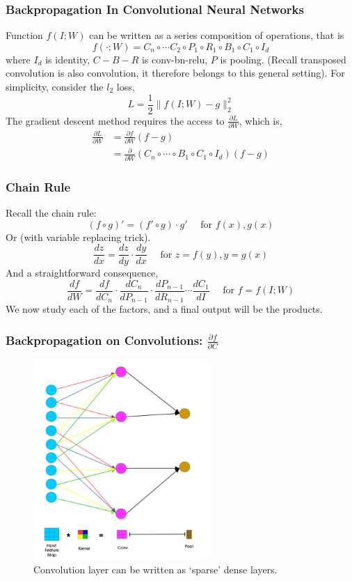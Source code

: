 \documentclass[10pt]{beamer}
\begin{document}
\begin{frame}
\frametitle{Backpropagation In Convolutional Neural Networks}
Function $f(I;W)$ can be written as a series composition of operations, that is
\[
f(\cdot;W) = C_n  \circ \cdots  C_2 \circ  P_1 \circ R_1 \circ B_1 \circ C_1 \circ I_d
\]
where $I_d$ is identity, $C-B-R$ is conv-bn-relu, $P$ is pooling. (Recall transposed convolution is also convolution, it therefore belongs to this general setting).
For simplicity, consider the $l_2$ loss,
\[
L = \frac{1}{2} \|f(I;W) - g\|_2^2
\] 
The gradient descent method requires the access to $\frac{\partial L}{\partial W}$, which is,
\begin{align*}
\frac{\partial L}{\partial W} &= \frac{\partial f}{\partial W} (f-g) \\
&= \frac{\partial }{\partial W}(C_n  \circ \cdots \circ B_1 \circ C_1 \circ I_d) (f-g)
\end{align*}
\end{frame}


\begin{frame}
\frametitle{Chain Rule}
Recall the chain rule:
\[
(f\circ g) ' = (f'\circ g ) \cdot g' \quad \text{ for }    f(x), g(x)
\]
Or (with variable replacing trick).
\[ \frac{dz}{dx} = \frac{dz}{dy} \cdot  \frac{dy}{dx}  \quad \text{ for } z=f(y), y=g(x)
\]
And a straightforward consequence,
\[ 
\frac{df}{dW} = \frac{df}{dC_n} \cdot  \frac{dC_n}{dP_{n-1}} \cdot  \frac{dP_{n-1}}{dR_{n-1}} \cdots \frac{dC_1}{dI} \quad \text{ for }  f = f(I;W)
\]
We now study each of the factors, and a final output will be the products.
\end{frame}


\begin{frame}
\frametitle{Backpropagation on Convolutions: $\frac{\partial f}{\partial C}$}
	\begin{figure}[H]
	\centerline{
		\includegraphics[width=0.6\textwidth]{convolution_forward.png}
	}
	\caption{Convolution layer can be written as `sparse' dense layers.}
	\end{figure}
\end{frame}
\end{document}
